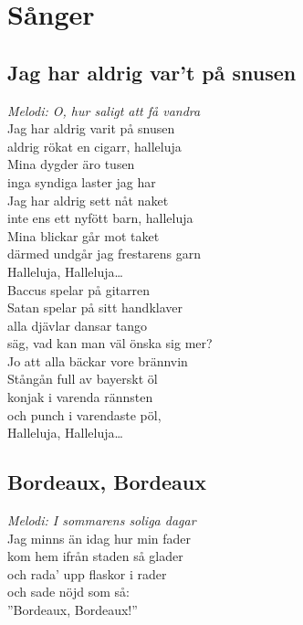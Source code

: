 \documentclass[a5paper]{article}
\begin{document}
	\newpage
		
	\section{Sånger}
	
	\subsection{Jag har aldrig var't på snusen}
		\textit{Melodi: O, hur saligt att få vandra} \\
		
		\noindent 
		Jag har aldrig varit på snusen \\ 
		aldrig rökat en cigarr, halleluja \\ 
		Mina dygder äro tusen \\ 
		inga syndiga laster jag har \\ 
		Jag har aldrig sett nåt naket \\ 
		inte ens ett nyfött barn, halleluja \\ 
		Mina blickar går mot taket \\ 
		därmed undgår jag frestarens garn \\ 
		
		\noindent
		Halleluja, Halleluja… \\ 
		
		\noindent
		Baccus spelar på gitarren \\ 
		Satan spelar på sitt handklaver \\ 
		alla djävlar dansar tango \\ 
		säg, vad kan man väl önska sig mer? \\ 	
		
		\noindent
		Jo att alla bäckar vore brännvin \\
		Stångån full av bayerskt öl \\
		konjak i varenda rännsten \\
		och punch i varendaste pöl, \\
	
		\noindent
		Halleluja, Halleluja…
	\newpage
	\subsection{Bordeaux, Bordeaux}
		\textit{Melodi: I sommarens soliga dagar} \\
		
		\noindent
		Jag minns än idag hur min fader \\
		kom hem ifrån staden så glader \\
		och rada’ upp flaskor i rader \\
		och sade nöjd som så: \\
		”Bordeaux, Bordeaux!” \\
		
\end{document}
